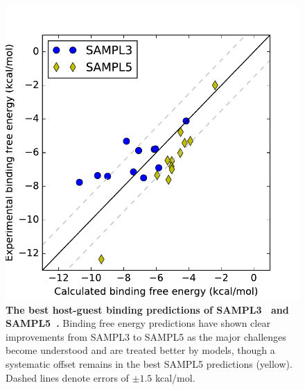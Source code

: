 \documentclass[11pt]{article}
\begin{document}
\begin{figure}
\vspace{-0.23in}
\begin{centering}
\includegraphics[width=\textwidth]{figures/sampl3_and_sampl5.pdf}

\end{centering}
\footnotesize
\caption{\label{figure:hg_sampl}  
\textbf{The best host-guest binding predictions of SAMPL3~\cite{muddana_sampl3_2012} and SAMPL5~\cite{yin_sampl5_2016}.} 
Binding free energy predictions have shown clear improvements from SAMPL3 to SAMPL5 as the major challenges become understood and are treated better by models, though a systematic offset remains in the best SAMPL5 predictions (yellow). Dashed lines denote errors of $\pm1.5$ kcal/mol.
}
\end{figure}
\end{document}
